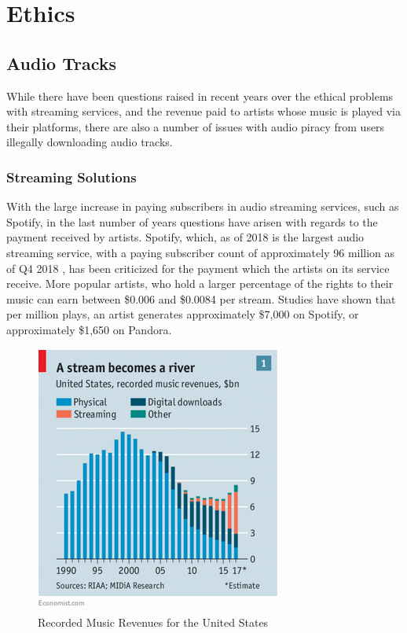 \documentclass[11pt,a4paper]{scrreprt}
\begin{document}
\chapter{Ethics}\label{ethics}

\section{Audio Tracks}\label{audio-tracks}

While there have been questions raised in recent years over the ethical
problems with streaming services, and the revenue paid to artists whose
music is played via their platforms, there are also a number of issues
with audio piracy from users illegally downloading audio tracks.

\subsection{Streaming Solutions}\label{streaming-solutions}

With the large increase in paying subscribers in audio streaming
services, such as Spotify, in the last number of years questions have
arisen with regards to the payment received by artists. Spotify, which,
as of 2018\cite{SpotPay18} is the largest audio streaming service, with
a paying subscriber count of approximately 96 million as of Q4 2018
\cite{SpotSubs18}, has been criticized for the payment which the artists
on its service receive. More popular artists, who hold a larger
percentage of the rights to their music can earn between \$0.006 and
\$0.0084 per stream. Studies have shown that per million plays, an
artist generates approximately \$7,000 on Spotify, or approximately
\$1,650 on Pandora\cite{CNBCSpot18}.

\begin{figure}[H]
\includegraphics{Ethics/StreamBecomesRiver.png}
\centering
\caption{Recorded Music Revenues for the United States \cite{SpotPay18}}
\label{StreamBecomesRiver}
\end{figure}
\end{document}
